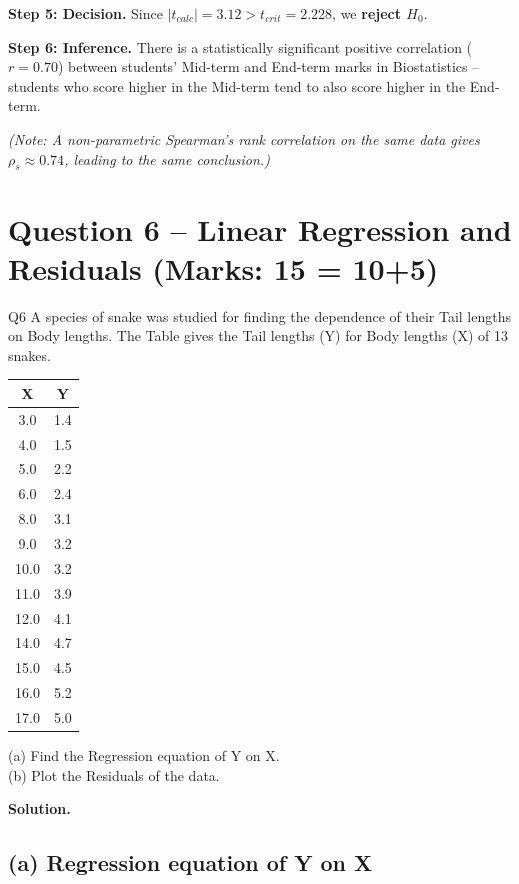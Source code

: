 \documentclass[11pt]{article}
\newcommand{\soln}{\par\noindent\textcolor{acolor}{\textbf{Solution.}}\quad}
\begin{document}
\textbf{Step 5: Decision.} Since $|t_{calc}| = 3.12 > t_{crit} = 2.228$, we \textbf{reject $H_0$}.

\textbf{Step 6: Inference.} There is a statistically significant positive correlation ($r=0.70$) between students' Mid-term and End-term marks in Biostatistics -- students who score higher in the Mid-term tend to also score higher in the End-term.

\textit{(Note: A non-parametric Spearman's rank correlation on the same data gives $\rho_s \approx 0.74$, leading to the same conclusion.)}

\section{Question 6 -- Linear Regression and Residuals (Marks: 15 = 10+5)}
\begin{question}{Q6}
A species of snake was studied for finding the dependence of their Tail lengths on Body lengths. The Table gives the Tail lengths (Y) for Body lengths (X) of 13 snakes.

\begin{center}
\begin{tabular}{cc}
\toprule
X & Y \\
\midrule
3.0 & 1.4 \\
4.0 & 1.5 \\
5.0 & 2.2 \\
6.0 & 2.4 \\
8.0 & 3.1 \\
9.0 & 3.2 \\
10.0 & 3.2 \\
11.0 & 3.9 \\
12.0 & 4.1 \\
14.0 & 4.7 \\
15.0 & 4.5 \\
16.0 & 5.2 \\
17.0 & 5.0 \\
\bottomrule
\end{tabular}
\end{center}

(a) Find the Regression equation of Y on X.\\
(b) Plot the Residuals of the data.
\end{question}

\soln

\subsection*{(a) Regression equation of Y on X}
\end{document}

